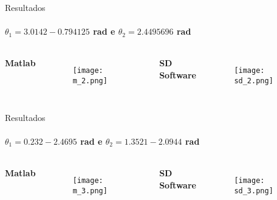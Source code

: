  \begin{frame}[c]{Resultados} 
    \framesubtitle{$\theta_{1}=3.0142-0.794125$ rad e $\theta_{2}=2.4495696$ rad}
    \begin{columns}
        \begin{center}
            \Large \textbf{Matlab}\\    
        \end{center}
        \begin{figure}
            \texttt{[image: m\_2.png]}
        \end{figure}
        \begin{center}
            \Large \textbf{SD Software}\\   
        \end{center}
        \begin{figure}
            \texttt{[image: sd\_2.png]}
        \end{figure}
              
    \end{columns}
\end{frame}
 \begin{frame}[c]{Resultados} 
    \framesubtitle{$\theta_{1}=0.232-2.4695$ rad e $\theta_{2}=1.3521- 2.0944$ rad}
    \begin{columns}
        \begin{center}
            \Large \textbf{Matlab}\\    
        \end{center}
        \begin{figure}
            \texttt{[image: m\_3.png]}
        \end{figure}
        \begin{center}
            \Large \textbf{SD Software}\\    
        \end{center}
        \begin{figure}
            \texttt{[image: sd\_3.png]}
        \end{figure}
              
    \end{columns}
\end{frame}

